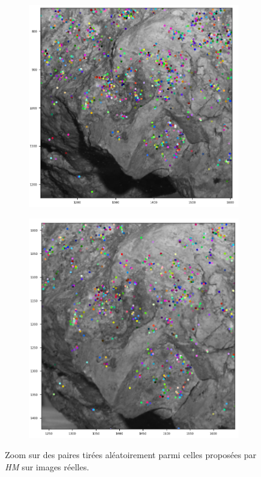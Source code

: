 \documentclass[
	a4paper, %
	10pt, %
	unnumberedsections, %
	twoside, %
]{LTJournalArticle}
\begin{document}
\begin{figure}
	\centering
	\begin{subfigure}[H]{0.45\textwidth}
		\centering
		\includegraphics[width=\textwidth]{images/irl_z2_g.png}
	\end{subfigure}
	\hfill
	\begin{subfigure}[H]{0.45\textwidth}
		\centering
		\includegraphics[width=\textwidth]{images/irl_z2_d.png}
	\end{subfigure}
	\caption{Zoom sur des paires tirées aléatoirement parmi celles proposées par \textit{HM} sur images réelles.}
	\label{figure:fig_irl}
\end{figure}
\end{document}
